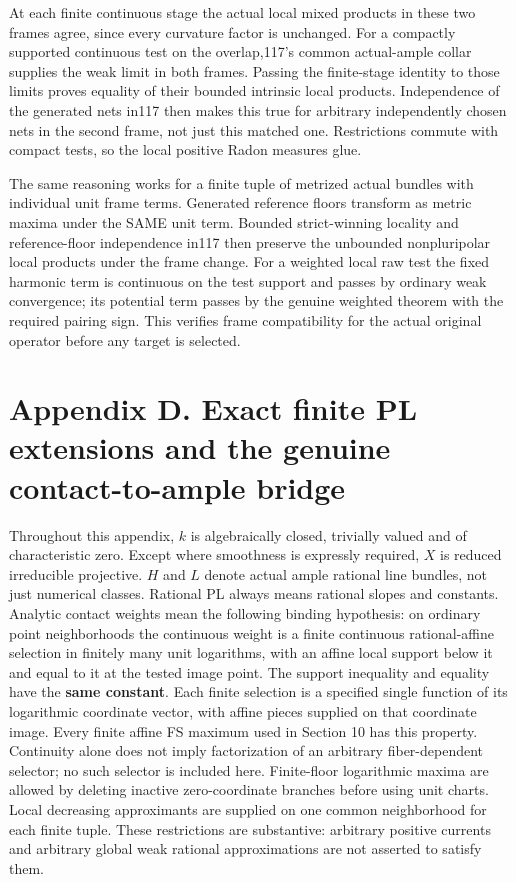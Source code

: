 \documentclass[
  10pt,
]{article}
\begin{document}
At each finite continuous stage the actual local mixed products in these
two frames agree, since every curvature factor is unchanged. For a
compactly supported continuous test on the overlap,117's common
actual-ample collar supplies the weak limit in both frames. Passing the
finite-stage identity to those limits proves equality of their bounded
intrinsic local products. Independence of the generated nets in117 then
makes this true for arbitrary independently chosen nets in the second
frame, not just this matched one. Restrictions commute with compact
tests, so the local positive Radon measures glue.

The same reasoning works for a finite tuple of metrized actual bundles
with individual unit frame terms. Generated reference floors transform
as metric maxima under the SAME unit term. Bounded strict-winning
locality and reference-floor independence in117 then preserve the
unbounded nonpluripolar local products under the frame change. For a
weighted local raw test the fixed harmonic term is continuous on the
test support and passes by ordinary weak convergence; its potential term
passes by the genuine weighted theorem with the required pairing sign.
This verifies frame compatibility for the actual original operator
before any target is selected.

\section{Appendix D. Exact finite PL extensions and the genuine
contact-to-ample
bridge}\label{appendix-d.-exact-finite-pl-extensions-and-the-genuine-contact-to-ample-bridge}

Throughout this appendix, \(k\) is algebraically closed, trivially
valued and of characteristic zero. Except where smoothness is expressly
required, \(X\) is reduced irreducible projective. \(H\) and \(L\)
denote actual ample rational line bundles, not just numerical classes.
Rational PL always means rational slopes and constants. Analytic contact
weights mean the following binding hypothesis: on ordinary point
neighborhoods the continuous weight is a finite continuous
rational-affine selection in finitely many unit logarithms, with an
affine local support below it and equal to it at the tested image point.
The support inequality and equality have the \textbf{same constant}.
Each finite selection is a specified single function of its logarithmic
coordinate vector, with affine pieces supplied on that coordinate image.
Every finite affine FS maximum used in Section 10 has this property.
Continuity alone does not imply factorization of an arbitrary
fiber-dependent selector; no such selector is included here.
Finite-floor logarithmic maxima are allowed by deleting inactive
zero-coordinate branches before using unit charts. Local decreasing
approximants are supplied on one common neighborhood for each finite
tuple. These restrictions are substantive: arbitrary positive currents
and arbitrary global weak rational approximations are not asserted to
satisfy them.
\end{document}
